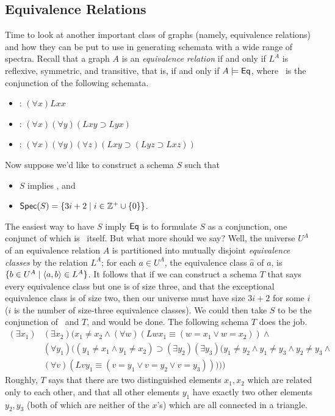 \subsection{Equivalence Relations}
Time to look at another important class of graphs (namely, equivalence relations) and how they can be put to use in generating schemata with a wide range of spectra. Recall that a graph $A$ is an \emph{equivalence relation} if and only if $L^A$ is reflexive, symmetric, and transitive, that is, if and only if $A\models\mbox{$\mathsf{Eq}$}$, where \eqr\ is the conjunction of the following schemata.
\begin{itemize}
\item
{}: $(\forall x)Lxx$
\item
\sym: $(\forall x)(\forall y)(Lxy\supset Lyx)$
\item
\trans: $(\forall x)(\forall y)(\forall z)(Lxy\supset(Lyz\supset Lxz))$
\end{itemize}

Now suppose we'd like to construct a schema $S$ such that
\begin{itemize}
\item
$S$ implies \eqr, and
\item
$\mbox{$\mathsf{Spec}(S)$}=\{3i+2\mid i\in\mathbb{Z}^+\cup\{0\}\}$.
\end{itemize}
The easiest way to have $S$ imply $\mbox{$\mathsf{Eq}$}$ is to formulate $S$ as a conjunction, one conjunct of which is \eqr\ itself. But what more should we say? Well, the universe $U^A$ of an equivalence relation $A$ is partitioned into mutually disjoint \emph{equivalence classes} by the relation $L^A$; for each $a\in U^A$, the equivalence class $\hat{a}$ of $a$, is $\{b\in U^A\mid \mbox{$\langle a,b \rangle$}\in L^A\}$. It follows that if we can construct a schema $T$ that says every equivalence class but one is of size three, and that the exceptional equivalence class is of size two, then our universe must have size $3i + 2$ for some $i$ ($i$ is the number of size-three equivalence classes). We could then take $S$ to be the conjunction of \eqr\ and $T$, and would be done. The following schema $T$ does the job.
\begin{align*} 
(\exists x_1)&(\exists x_2)(x_1\neq x_2\wedge (\forall w)(Lwx_1\equiv(w=x_1\vee w=x_2))\wedge\\
&(\forall y_1) ((y_1\neq x_1\wedge y_1\neq x_2)\supset(\exists y_2)(\exists y_3)(y_1\neq y_2\wedge y_1\neq y_3\wedge y_2\neq y_3\wedge\\
& (\forall v)(Lvy_1\equiv(v=y_1\vee v=y_2\vee v=y_3)))))
\end{align*}
Roughly, $T$ says that there are two distinguished elements $x_1, x_2$ which are related only to each other, and that all other elements $y_1$ have exactly two other elements $y_2, y_3$ (both of which are neither of the $x$'s) which are all connected in a triangle. 

